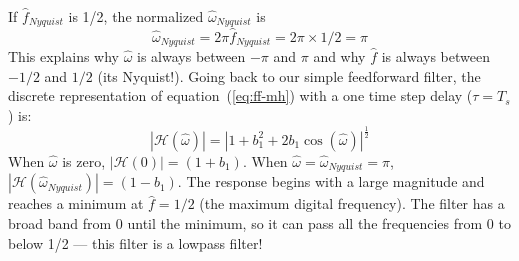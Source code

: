 If $\hat{f}_\mathit{Nyquist}$ is 1/2, the normalized
$\hat{\omega}_\mathit{Nyquist}$ is
\begin{equation}
\hat{\omega}_\mathit{Nyquist} = 2\pi \hat{f}_\mathit{Nyquist}= 2\pi \times 1/2 = \pi 
\end{equation}
%
This explains why $\hat{\omega}$ is always between $-\pi$ and $\pi$ and why $\hat{f}$ is always between $-1/2$ and $1/2$ (its Nyquist!). Going back to our simple feedforward filter, the discrete
representation of equation~(\ref{eq:ff-mh}) with a one time step delay
($\tau = T_s$) is:
\begin{equation}
|\mathcal{H}(\hat{\omega})|=|1+b_1^2 + 2b_1
\cos(\hat{\omega})|^\frac{1}{2}
\end{equation}
When $\hat{\omega}$ is zero, $|\mathcal{H}(0)|=(1+b_1)$. When $\hat{\omega}=\hat{\omega}_\mathit{Nyquist}=\pi$,
$|\mathcal{H}(\hat{\omega}_\mathit{Nyquist})|=(1-b_1)$. The response begins with a large magnitude and reaches a minimum at $\hat{f}=1/2$ (the maximum digital frequency).
The filter has a broad band from 0 until the minimum, so it can pass all
the frequencies from 0 to below 1/2 --- this filter is a lowpass
filter!



